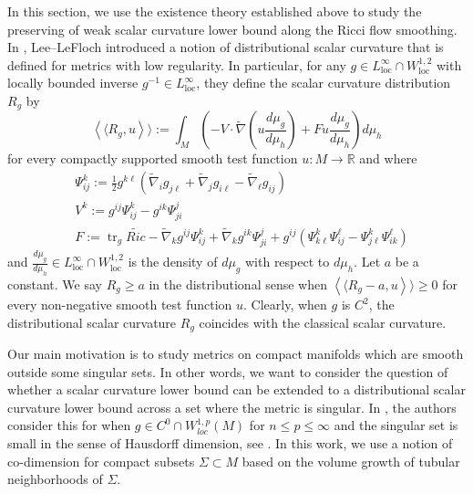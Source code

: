 \documentclass[12pt]{amsart}
\def\tr{\operatorname{tr}}
\theoremstyle{plain}
\theoremstyle{plain}
\theoremstyle{definition}
\theoremstyle{remark}
\numberwithin{equation}{subsection}
\newcommand{\hdel}{\tilde{\nabla}}
\begin{document}
In this section, we use the existence theory established above to study the preserving of weak scalar curvature lower bound along the Ricci flow smoothing.
In \cite{lee_positive_2015}, Lee--LeFloch introduced a notion of distributional scalar curvature that is defined for metrics with low regularity. In particular, for any $g \in L^\infty_{\text{loc}}\cap W^{1,2}_{\text{loc}}$ with locally bounded inverse $g^{-1}\in L^\infty_{\text{loc}}$, they define the scalar curvature distribution $R_g$ by
\begin{equation}\label{eqn:distributional-scalar-defn}
    \left\langle\langle R_g, u\right\rangle\rangle := \int_M \left(-V\cdot\hdel\left(u\frac{d\mu_g}{d\mu_h}\right)+Fu\frac{d\mu_g}{d\mu_h}\right)d\mu_h
\end{equation}
for every compactly supported smooth test function $u:M\to\mathbb{R}$ and where
\begin{align*}
    &\Psi^k_{ij} := \frac{1}{2}g^{k\ell}\left(\hdel_ig_{j\ell}+\hdel_jg_{i\ell}-\hdel_{\ell}g_{ij}\right) \\
    &V^k := g^{ij}\Psi^{k}_{ij} - g^{ik}\Psi^{j}_{ji} \\
    &F := \tr_g\widetilde{Ric} - \hdel_kg^{ij}\Psi^k_{ij} + \hdel_kg^{ik}\Psi^{j}_{ji} + g^{ij}\left(\Psi^{k}_{k\ell}\Psi^{\ell}_{ij} - \Psi^{k}_{j\ell}\Psi^{\ell}_{ik}\right)
\end{align*}
and $\frac{d\mu_g}{d\mu_h}\in L^\infty_{\text{loc}}\cap W^{1,2}_{\text{loc}}$ is the density of $d\mu_g$ with respect to $d\mu_h$. Let $a$ be a constant. We say $R_g \geq a$ in the distributional sense when $    \left\langle\langle R_g-a, u\right\rangle\rangle\geq 0$ for every non-negative smooth test function $u$. Clearly, when $g$ is $C^2$, the distributional scalar curvature $R_g$ coincides with the classical scalar curvature.


Our main motivation is to study metrics on compact manifolds which are smooth outside some singular sets. In other words, we want to consider the question of whether a scalar curvature lower bound can be extended to a distributional scalar curvature lower bound across a set where the metric is singular.  In \cite{jiang_removable_2022}, the authors consider this for when $g \in C^0 \cap W^{1,p}_{loc}(M)$ for $n \leq p \leq \infty$ and the singular set is small in the sense of Hausdorff dimension, see  \cite[Lemma 2.7]{jiang_removable_2022}. In this work, we use a notion of co-dimension for compact subsets $\Sigma \subset M$ based on the volume growth of tubular neighborhoods of $\Sigma$. %
\end{document}
